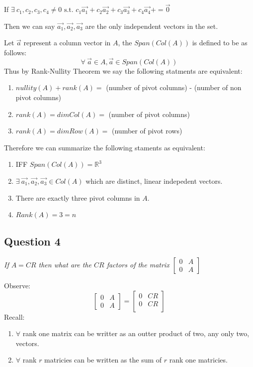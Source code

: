 \documentclass[11pt]{article}
\theoremstyle{plain}
\begin{document}
If $\exists ~c_1, c_2, c_3, c_4 \neq 0 \text{ s.t. } c_1\vec{a_1} + c_2\vec{a_2} + c_3\vec{a_3} + c_4\vec{a_4} + = \vec{0}$
\begin{center}
	Then we can say $\vec{a_1}, \vec{a_2}, \vec{a_3}$ are the only independent vectors in the set.
\end{center}
Let $\vec{a}$ represent a column vector in $A$, the $Span(Col(A))$ is defined to be as follows:
\[
	\forall ~\vec{a} \in A, \vec{a} \in Span(Col(A))
\]
Thus by Rank-Nullity Theorem we say the following statments are equivalent:
\begin{enumerate}
	\item $nullity(A)+rank(A)=$ (number of pivot columns) - (number of non pivot columns)
	\item $rank(A)=dimCol(A)=$ (number of pivot columns)
	\item $rank(A)=dimRow(A)=$ (number of pivot rows)
\end{enumerate}
Therefore we can summarize the following staments as equivalent:
\begin{enumerate}
	\item IFF $Span(Col(A)) = \mathbb{R}^3$
	\item $\exists ~\vec{a_1}, \vec{a_2}, \vec{a_3} \in Col(A)$ which are distinct, linear indepedent vectors.
	\item There are exactly three pivot columns in $A$.
	\item $Rank(A)=3=n$
\end{enumerate}
\begin{center}
	\section*{Question 4}
\end{center}
\begin{center}
	\textit{If $A=CR$ then what are the $CR$ factors of the matrix $\begin{bmatrix} 0 & A \\ 0 & A \end{bmatrix}$}
\end{center}
Observe:
\[
	\begin{bmatrix} 0 & A \\ 0 & A \end{bmatrix} =
	\begin{bmatrix}
		0 & CR \\
		0 & CR \\
	\end{bmatrix}
\]
Recall:
\begin{enumerate}
	\item $\forall$ rank one matrix can be writter as an outter product of two, any only two, vectors.
	\item $\forall$ rank $r$ matricies can be written as the sum of $r$ rank one matricies.
\end{enumerate}
\end{document}

